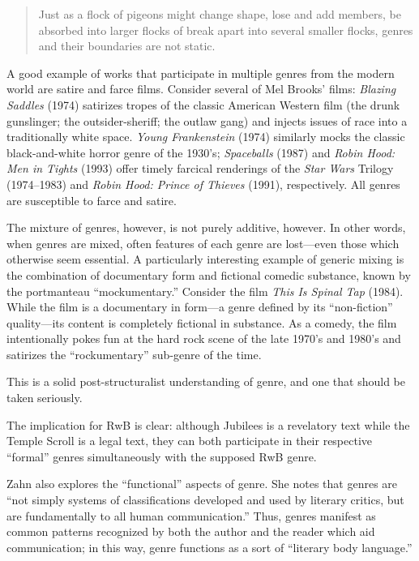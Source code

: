 \begin{quote}
Just as a flock of pigeons might change shape, lose and add members, be
absorbed into larger flocks of break apart into several smaller flocks,
genres and their boundaries are not static.\autocite[277]{zahn_jbl2012}
\end{quote}

A good example of works that participate in multiple genres from the
modern world are satire and farce films. Consider several of Mel Brooks'
films: \emph{Blazing Saddles} (1974) satirizes tropes of the classic
American Western film (the drunk gunslinger; the outsider-sheriff; the
outlaw gang) and injects issues of race into a traditionally white
space. \emph{Young Frankenstein} (1974) similarly mocks the classic
black-and-white horror genre of the 1930's; \emph{Spaceballs} (1987) and
\emph{Robin Hood: Men in Tights} (1993) offer timely farcical renderings
of the \emph{Star Wars} Trilogy (1974--1983) and \emph{Robin Hood:
Prince of Thieves} (1991), respectively. All genres are susceptible to
farce and satire.

The mixture of genres, however, is not purely additive, however. In
other words, when genres are mixed, often features of each genre are
lost---even those which otherwise seem essential. A particularly
interesting example of generic mixing is the combination of documentary
form and fictional comedic substance, known by the portmanteau
``mockumentary.'' Consider the film \emph{This Is Spinal Tap} (1984).
While the film is a documentary in form---a genre defined by its
``non-fiction'' quality---its content is completely fictional in
substance. As a comedy, the film intentionally pokes fun at the hard
rock scene of the late 1970's and 1980's and satirizes the
``rockumentary'' sub-genre of the time.

This is a solid post-structuralist understanding of genre, and one that
should be taken seriously.

The implication for RwB is clear: although Jubilees is a revelatory text
while the Temple Scroll is a legal text, they can both participate in
their respective ``formal'' genres simultaneously with the supposed RwB
genre.

Zahn also explores the ``functional'' aspects of genre. She notes that
genres are ``not simply systems of classifications developed and used by
literary critics, but are fundamentally to all human
communication.''\autocite[280]{zahn_jbl2012} Thus, genres manifest as
common patterns recognized by both the author and the reader which aid
communication;\autocites[276]{zahn_jbl2012}[See
also][199]{newsome_grossman2010} in this way, genre functions as a sort
of ``literary body language.''

